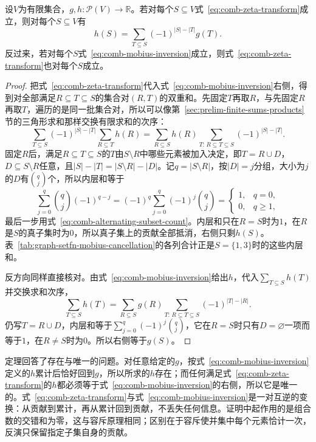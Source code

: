 \begin{theorem}
\label{thm:comb-mobius-inversion}
设$V$为有限集合，$g,h:\mathcal P(V)\to\mathbb R$。若对每个$S\subseteq V$式~\eqref{eq:comb-zeta-transform}成立，则对每个$S\subseteq V$有
\begin{equation}
  h(S)=\sum_{T\subseteq S}(-1)^{|S|-|T|}g(T).
  \label{eq:comb-mobius-inversion}
\end{equation}
反过来，若对每个$S$式~\eqref{eq:comb-mobius-inversion}成立，则式~\eqref{eq:comb-zeta-transform}也对每个$S$成立。
\end{theorem}

\begin{proof}
把式~\eqref{eq:comb-zeta-transform}代入式~\eqref{eq:comb-mobius-inversion}右侧，得到对全部满足$R\subseteq T\subseteq S$的集合对$(R,T)$的双重和。先固定$T$再取$R$，与先固定$R$再取$T$，遍历的是同一批集合对，所以可以像第~\ref{sec:prelim-finite-sums-products}节的三角形求和那样交换有限求和的次序：
\[
  \sum_{T\subseteq S}(-1)^{|S|-|T|}\sum_{R\subseteq T}h(R)
  =\sum_{R\subseteq S}h(R)\sum_{T:\,R\subseteq T\subseteq S}(-1)^{|S|-|T|}.
\]
固定$R$后，满足$R\subseteq T\subseteq S$的$T$由$S\setminus R$中哪些元素被加入决定，即$T=R\cup D$，$D\subseteq S\setminus R$任意，且$|S|-|T|=|S\setminus R|-|D|$。记$q=|S\setminus R|$，按$|D|=j$分组，大小为$j$的$D$有$\binom qj$个，所以内层和等于
\[
  \sum_{j=0}^{q}\binom qj(-1)^{q-j}=(-1)^q\sum_{j=0}^{q}(-1)^j\binom qj
  =\begin{cases}1,&q=0,\\0,&q\geq1,\end{cases}
\]
最后一步用式~\eqref{eq:comb-alternating-subset-count}。内层和只在$R=S$时为$1$，在$R$是$S$的真子集时为$0$，所以真子集上的贡献全部抵消，右侧只剩$h(S)$。表~\ref{tab:graph-setfn-mobius-cancellation}的各列合计正是$S=\{1,3\}$时的这些内层和。

反方向同样直接核对。由式~\eqref{eq:comb-mobius-inversion}给出$h$，代入$\sum_{T\subseteq S}h(T)$并交换求和次序，
\[
  \sum_{T\subseteq S}h(T)=\sum_{R\subseteq S}g(R)\sum_{T:\,R\subseteq T\subseteq S}(-1)^{|T|-|R|}.
\]
仍写$T=R\cup D$，内层和等于$\sum_{j=0}^{q}(-1)^j\binom qj$，它在$R=S$时只有$D=\varnothing$一项而等于$1$，在$R\neq S$时为$0$。所以右侧等于$g(S)$。
\end{proof}

定理回答了存在与唯一的问题。对任意给定的$g$，按式~\eqref{eq:comb-mobius-inversion}定义的$h$累计后恰好回到$g$，所以所求的$h$存在；而任何满足式~\eqref{eq:comb-zeta-transform}的$h$都必须等于式~\eqref{eq:comb-mobius-inversion}的右侧，所以它是唯一的。式~\eqref{eq:comb-zeta-transform}与式~\eqref{eq:comb-mobius-inversion}是一对互逆的变换：从贡献到累计，再从累计回到贡献，不丢失任何信息。证明中起作用的是组合数的交错和为零，这与容斥原理相同；区别在于容斥使并集中每个元素恰计一次，反演只保留指定子集自身的贡献。


